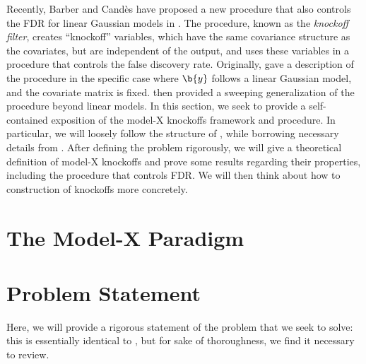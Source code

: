 
\label{chapter2}

Recently, Barber and Cand\`{e}s have proposed a new procedure that also controls the FDR for linear Gaussian models in \cite{knockoffs}. The procedure, known as the \emph{knockoff filter}, creates ``knockoff'' variables, which have the same covariance structure as the covariates, but are independent of the output, and uses these variables in a procedure that controls the false discovery rate. Originally, \cite{knockoffs} gave a description of the procedure in the specific case where $\b{y}$ follows a linear Gaussian model, and the covariate matrix is fixed. \cite{panning} then provided a sweeping generalization of the procedure beyond linear models. In this section, we seek to provide a self-contained exposition of the model-X knockoffs framework and procedure. In particular, we will loosely follow the structure of \cite{panning}, while borrowing necessary details from \cite{knockoffs}. After defining the problem rigorously, we will give a theoretical definition of model-X knockoffs and prove some results regarding their properties, including the procedure that controls FDR. We will then think about how to construction of knockoffs more concretely.

\section{The Model-X Paradigm}

\section{Problem Statement}
Here, we will provide a rigorous statement of the problem that we seek to solve: this is essentially identical to \cite{panning}, but for sake of thoroughness, we find it necessary to review.

